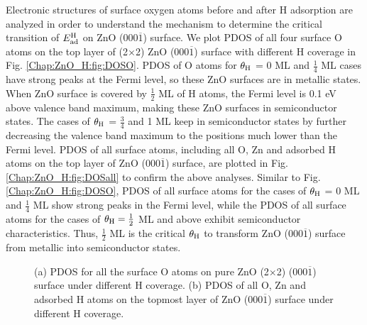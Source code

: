 Electronic structures of surface oxygen atoms before and after H adsorption are analyzed in order to understand the mechanism to determine the critical transition of $E_{\textup{ad}}^{\textup{H}}$ on ZnO (000$\overline{1}$) surface. We plot \ac{PDOS} of all four surface O atoms on the top layer of (2$\times$2) ZnO (000$\overline{1}$) surface with different H coverage in Fig. \ref{Chap:ZnO_H:fig:DOSO}. \ac{PDOS} of O atoms for $\theta_{\textup{H}}$ = 0 ML and $\frac{1}{4}$ ML cases have strong peaks at the Fermi level, so these ZnO surfaces are in metallic states. When ZnO surface is covered by $\frac{1}{2}$ ML of H atoms, the Fermi level is 0.1 eV above valence band maximum, making these ZnO surfaces in semiconductor states. The cases of  $\theta_{\textup{H}}$ = $\frac{3}{4}$ and 1 ML keep in semiconductor states by further decreasing the valence band maximum to the positions much lower than the Fermi level. \ac{PDOS} of all surface atoms, including all O, Zn and adsorbed H atoms on the top layer of ZnO (000$\overline{1}$) surface, are plotted in Fig. \ref{Chap:ZnO_H:fig:DOSall} to confirm the above analyses. Similar to Fig. \ref{Chap:ZnO_H:fig:DOSO},  \ac{PDOS} of all surface atoms for the cases of $\theta_{\textup{H}}$ =  0 ML and $\frac{1}{4}$ ML show strong peaks in the Fermi level, while the \ac{PDOS} of all surface atoms for the cases of $\theta_{\textup{H}}=\frac{1}{2}$ ML and above exhibit semiconductor characteristics. Thus,  $\frac{1}{2}$ ML is the critical $\theta_{\textup{H}}$ to transform  ZnO (000$\overline{1}$) surface from metallic into semiconductor states. 

\begingroup
\begin{figure}[!ht]
  \centering
  \label{Chap:ZnO_H:fig:DOSO}
  \label{Chap:ZnO_H:fig:DOSall}
  \caption[\ac{PDOS} for all the surface O atoms on pure ZnO (2$\times$2) (000$\overline{1}$) surface under different H coverage]{(a) \ac{PDOS} for all the surface O atoms on pure ZnO (2$\times$2) (000$\overline{1}$) surface under different H coverage. (b) \ac{PDOS} of all O, Zn and adsorbed H atoms on the topmost layer of ZnO (000$\overline{1}$) surface under different H coverage.}
  \label{Chap:ZnO_H:fig:DOS}
\end{figure}
\endgroup

